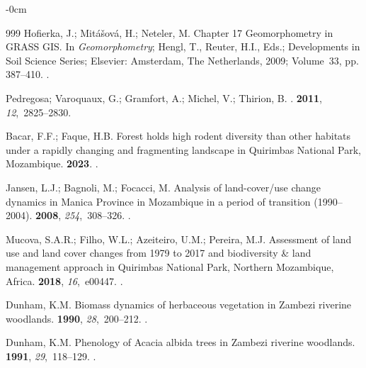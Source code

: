 \documentclass[coasts,article,accept,pdftex,oneauthor]{Definitions/mdpi}
\begin{document}
\begin{adjustwidth}{-\extralength}{0cm}
\begin{thebibliography}{999}
Hofierka, J.; Mitášová, H.; Neteler, M.
\newblock Chapter 17 Geomorphometry in GRASS GIS. In {\em Geomorphometry};
  Hengl, T., Reuter, H.I., Eds.; Developments in
  Soil Science Series; Elsevier: Amsterdam, The Netherlands, 2009; Volume~33, pp. 387--410. %
.

Pedregosa; Varoquaux, G.; Gramfort, A.; Michel, V.; Thirion, B.
.
 {\bf 2011}, {\em
  12},~2825--2830.

Bacar, F.F.; Faque, H.B.
\newblock Forest holds high rodent diversity than other habitats under a
  rapidly changing and fragmenting landscape in Quirimbas National Park,
  Mozambique.
 {\bf 2023}.
.

Jansen, L.J.; Bagnoli, M.; Focacci, M.
\newblock Analysis of land-cover/use change dynamics in Manica Province in
  Mozambique in a period of transition (1990–2004).
 {\bf 2008}, {\em 254},~308--326.
.

Mucova, S.A.R.; Filho, W.L.; Azeiteiro, U.M.; Pereira, M.J.
\newblock Assessment of land use and land cover changes from 1979 to 2017 and
  biodiversity \& land management approach in Quirimbas National Park, Northern
  Mozambique, Africa.
 {\bf 2018}, {\em 16},~e00447.
.

Dunham, K.M.
\newblock Biomass dynamics of herbaceous vegetation in Zambezi riverine
  woodlands.
 {\bf 1990}, {\em 28},~200--212.
.

Dunham, K.M.
\newblock Phenology of Acacia albida trees in Zambezi riverine woodlands.
 {\bf 1991}, {\em 29},~118--129.
.


\end{thebibliography}
\end{adjustwidth}
\end{document}
